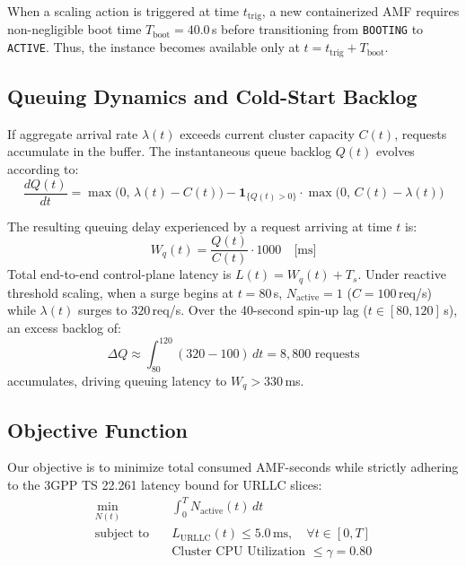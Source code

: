 \documentclass[conference]{IEEEtran}
\begin{document}
When a scaling action is triggered at time $t_{\text{trig}}$, a new containerized AMF requires non-negligible boot time $T_{\text{boot}} = 40.0$\,s before transitioning from \texttt{BOOTING} to \texttt{ACTIVE}. Thus, the instance becomes available only at $t = t_{\text{trig}} + T_{\text{boot}}$.

\subsection{Queuing Dynamics and Cold-Start Backlog}
If aggregate arrival rate $\lambda(t)$ exceeds current cluster capacity $C(t)$, requests accumulate in the buffer. The instantaneous queue backlog $Q(t)$ evolves according to:
\begin{equation}
\frac{dQ(t)}{dt} = \max\Big(0, \, \lambda(t) - C(t)\Big) - \mathbf{1}_{\{Q(t) > 0\}} \cdot \max\Big(0, \, C(t) - \lambda(t)\Big)
\end{equation}

The resulting queuing delay experienced by a request arriving at time $t$ is:
\begin{equation}
W_q(t) = \frac{Q(t)}{C(t)} \cdot 1000 \quad \text{[ms]}
\end{equation}
Total end-to-end control-plane latency is $L(t) = W_q(t) + T_s$. Under reactive threshold scaling, when a surge begins at $t=80$\,s, $N_{\text{active}} = 1$ ($C = 100$\,req/s) while $\lambda(t)$ surges to $320$\,req/s. Over the 40-second spin-up lag ($t \in [80, 120]$\,s), an excess backlog of:
\begin{equation}
\Delta Q \approx \int_{80}^{120} (320 - 100) \, dt = 8{,}800 \text{ requests}
\end{equation}
accumulates, driving queuing latency to $W_q > 330$\,ms.

\subsection{Objective Function}
Our objective is to minimize total consumed AMF-seconds while strictly adhering to the 3GPP TS 22.261 latency bound for URLLC slices:
\begin{equation}
\begin{aligned}
\min_{N(t)} \quad & \int_{0}^{T} N_{\text{active}}(t) \, dt \\
\text{subject to} \quad & L_{\text{URLLC}}(t) \le 5.0\,\text{ms}, \quad \forall t \in [0, T] \\
& \text{Cluster CPU Utilization } \le \gamma = 0.80
\end{aligned}
\end{equation}
\end{document}
